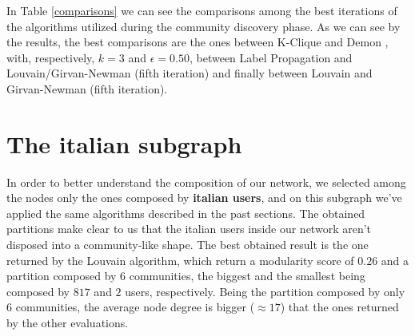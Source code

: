     In Table \ref{comparisons} we can see the comparisons among the best iterations of the algorithms
    utilized during the community discovery phase. As we can see by the results, the best comparisons are
    the ones between K-Clique and Demon , with, respectively, $k = 3$ and $\epsilon = 0.50$, between Label
    Propagation and Louvain/Girvan-Newman (fifth iteration) and finally between Louvain and Girvan-Newman
    (fifth iteration).

\section{The italian subgraph} %
\label{sec:the_italian_subgraph}
    In order to better understand the composition of our network, we selected among the nodes only the ones
    composed by \textbf{italian users}, and on this subgraph we've applied the same algorithms described
    in the past sections. The obtained partitions make clear to us that the italian users inside our
    network aren't disposed into a community-like shape. The best obtained result is the one returned by the
    Louvain algorithm, which return a modularity score of $0.26$ and a partition composed by $6$
    communities, the biggest and the smallest being composed by $817$ and $2$ users, respectively. Being
    the partition composed by only $6$ communities, the average node degree is bigger
    ($\approx 17$) that the ones returned by the other evaluations.

